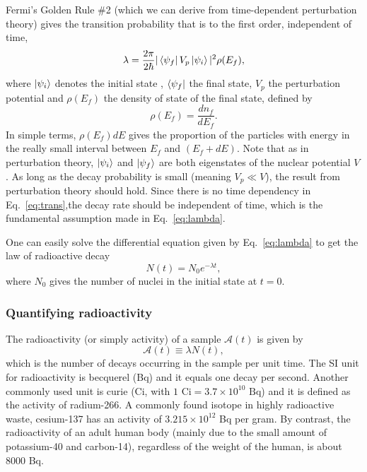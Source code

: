 \documentclass[nofootinbib,preprint,aps]{revtex4-1}
\begin{document}
        Fermi's Golden Rule \#2 (which we can derive from time-dependent
        perturbation theory)
        gives the transition probability that is to the first order, independent of time,
        \begin{equation}
            \label{eq:trans}
            \lambda = \frac{2\pi}{2\hbar}|\bra{\psi_f}V_p\ket{\psi_i}|^2\rho(E_f),
        \end{equation}
        where $\ket{\psi_i}$ denotes the initial state , $\bra{\psi_f}$ the final state, $V_p$ the perturbation
        potential and $\rho(E_f)$ the density of state of the final state, defined by
        \begin{equation}
            \rho(E_f) = \frac{dn_f}{dE_f}.
        \end{equation}
        In simple terms, $\rho(E_f)dE$ gives the proportion of the particles with energy in the
        really small interval between
        $E_f$ and $(E_f+dE)$.
        Note that as in perturbation theory, $\ket{\psi_i}$ and
        $\ket{\psi_f}$ are both eigenstates of the nuclear potential $V$. As long as
        the decay probability is small (meaning $V_p\ll V$), the result from perturbation theory should hold. Since
        there is no time dependency in Eq.~\ref{eq:trans},the
        decay rate should be independent of time, which is the fundamental assumption made in
        Eq.~\ref{eq:lambda}.
        
        One can easily solve the differential equation given by Eq.~\ref{eq:lambda} to get
        the law of radioactive decay
        \begin{equation}
            N(t) = N_0 e^{-\lambda t},
        \end{equation}
        where $N_0$ gives the number of nuclei in the initial state at $t=0$.


        \subsubsection{Quantifying radioactivity}
        The radioactivity (or simply activity) of a sample $\mathcal{A}(t)$ is given by
        \begin{equation}
            \label{eq:act}
            \mathcal{A}(t)\equiv \lambda N(t),
        \end{equation}
        which is the number of decays occurring in the sample per unit time. The SI
        unit for radioactivity is becquerel (Bq) and it equals one decay per second. Another commonly used
        unit is curie (Ci, with $1\text{ Ci}=3.7\times 10^{10}\text{ Bq}$) and it is defined as
        the activity of radium-266. A commonly found isotope in highly radioactive waste,
        cesium-137 has an activity of $3.215\times 10^{12}$ Bq
        per gram. By contrast, the radioactivity of an adult human body (mainly due to the small amount of 
        potassium-40 and carbon-14), regardless of the weight of the human, is about $8000$ Bq.
\end{document}
